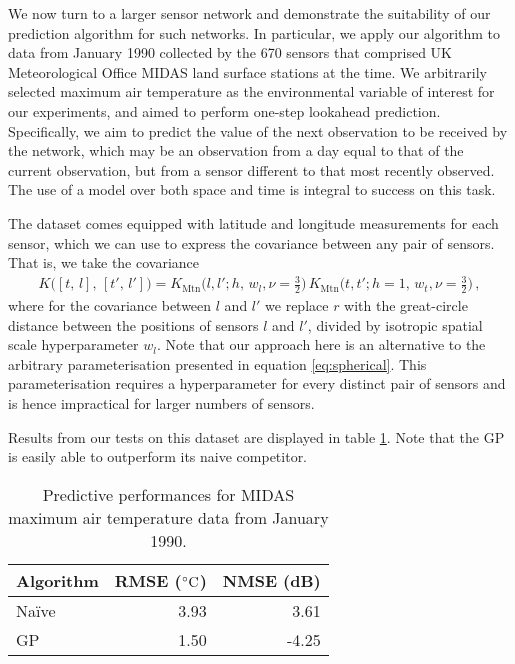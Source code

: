 \documentclass{acmtrans2m}
\newcommand{\Kl}[1]{K_{\text{#1}}}
\begin{document}
We now turn to a larger sensor network and demonstrate the suitability of our prediction algorithm for such networks. In particular, we apply our algorithm to data from January 1990 collected by the 670 sensors that comprised UK Meteorological Office MIDAS land
surface stations at the time. We arbitrarily selected maximum air temperature as the environmental variable of interest for our experiments, and aimed to perform one-step lookahead prediction. Specifically, we aim to predict the value of the next observation to be received by the network, which may be an observation from a day equal to that of the current observation, but from a sensor different to that most recently observed. The use of a model over both space and time is integral to success on this task.

The dataset comes equipped with latitude and longitude measurements for each sensor, which we can use to express the covariance between any pair of sensors. That is, we take the covariance
\begin{multline} \label{eq:MIDAS_cov}
 K\bigl([t,\,l],\,[t',\,l']\bigr)=
 \Kl{Mtn}\bigl(l,l';h,\,w_l,\nu=\tfrac{3}{2}\bigr)\,
\Kl{Mtn}\bigl(t,t';h=1,\,w_t,\nu=\tfrac{3}{2}\bigr)
\,,
\end{multline}
where for the covariance between $l$ and $l'$ we replace $r$ with the great-circle distance between the positions of sensors $l$ and $l'$, divided by isotropic spatial scale hyperparameter $w_l$. Note that our approach here is an alternative to the arbitrary parameterisation presented in equation \eqref{eq:spherical}. This parameterisation requires a hyperparameter for every distinct pair of sensors and is hence impractical for larger numbers of sensors.

Results from our tests on this dataset are displayed in table \ref{tbl:MIDAS_RMSEs}. Note that the GP is easily able to outperform its naive competitor.

\begin{table}
\centering
\caption{Predictive performances for MIDAS maximum air temperature data from January 1990.}
\label{tbl:MIDAS_RMSEs}
 \begin{tabular}{@{}lrr@{}}
 \toprule
Algorithm & RMSE ($^\circ\text{C}$) & NMSE (dB)\\
\midrule
Na\"{i}ve & 3.93 & 3.61\\
GP & 1.50 & -4.25 \\
\bottomrule
\end{tabular}
\end{table}
\end{document}
